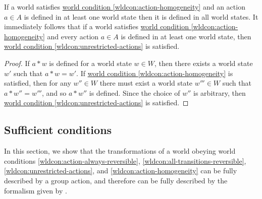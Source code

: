 \begin{proposition}
    If a world satisfies \hyperref[wldcon:action-homogeneity]{world condition \ref*{wldcon:action-homogeneity}} and an action $a \in A$ is defined in at least one world state then it is defined in all world states.
    It immediately follows that if a world satisfies \hyperref[wldcon:action-homogeneity]{world condition \ref*{wldcon:action-homogeneity}} and every action $a \in A$ is defined in at least one world state, then \hyperref[wldcon:unrestricted-actions]{world condition \ref*{wldcon:unrestricted-actions}} is satisfied.
\end{proposition}
\begin{proof}
    If $a * w$ is defined for a world state $w \in W$, then there exists a world state $w'$ such that $a * w = w'$.
    If \hyperref[wldcon:action-homogeneity]{world condition \ref*{wldcon:action-homogeneity}} is satisfied, then for any $w'' \in W$ there must exist a world state $w''' \in W$ such that $a * w'' = w'''$, and so $a * w''$ is defined.
    Since the choice of $w''$ is arbitrary, then \hyperref[wldcon:unrestricted-actions]{world condition \ref*{wldcon:unrestricted-actions}} is satisfied.

\end{proof}


\subsection{Sufficient conditions}

In this section, we show that the transformations of a world obeying world conditions \ref{wldcon:action-always-reversible}, \ref{wldcon:all-transitions-reversible}, \ref{wldcon:unrestricted-actions}, and \ref{wldcon:action-homogeneity} can be fully described by a group action, and therefore can be fully described by the formalism given by \cite{Higgins2018}.

